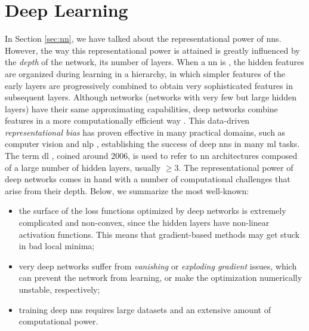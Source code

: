 \section{Deep Learning}\label{sec:deep-learning}
In Section \ref{sec:nn}, we have talked about the representational power of \glspl{nn}. However, the way this representational power is attained is greatly influenced by the \emph{depth} of the network, \ie its number of layers. When a \gls{nn} is , the hidden features are organized during learning in a hierarchy, in which simpler features of the early layers are progressively combined to obtain very sophisticated features in subsequent layers. Although  networks (networks with very few but large hidden layers) have their same approximating capabilities, deep networks combine features in a more computationally efficient way \citep{bengio2009deeparch}. This data-driven \emph{representational bias} has proven effective in many practical domains, such as computer vision \citep{krizhevsky2017imagenet} and \gls{nlp} \citep{vaswani2017transformer}, establishing the success of deep \glspl{nn} in many \gls{ml} tasks. The term \gls{dl} \citep{goodfellow2016dl}, coined around 2006, is used to refer to \gls{nn} architectures composed of a large number of hidden layers, usually $\geq 3$. The representational power of deep networks comes in hand with a number of computational challenges that arise from their depth. Below, we summarize the most well-known:
\begin{itemize}
    \item the surface of the loss functions optimized by deep networks is extremely complicated and non-convex, since the hidden layers have non-linear activation functions. This means that gradient-based methods may get stuck in bad local minima;
    \item very deep networks suffer from \emph{vanishing} or \emph{exploding gradient} issues, which can prevent the network from learning, or make the optimization numerically unstable, respectively;
    \item training deep \glspl{nn} requires large datasets and an extensive amount of computational power.
\end{itemize}
